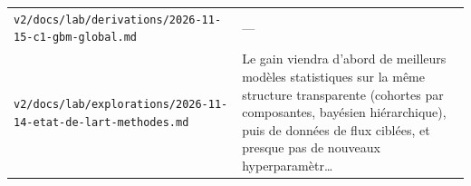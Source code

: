 \begin{small}
\begin{longtable}{@{}p{}p{}@{}}
\texttt{v2/docs/lab/derivations/2026-11-15-c1-gbm-global.md} & — \\
\texttt{v2/docs/lab/explorations/2026-11-14-etat-de-lart-methodes.md} & Le gain viendra d'abord de meilleurs modèles statistiques sur la même structure transparente (cohortes par composantes, bayésien hiérarchique), puis de données de flux ciblées, et presque pas de nouveaux hyperparamètr… \\
\bottomrule\end{longtable}\end{small}
